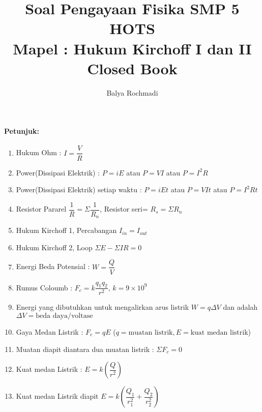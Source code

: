\documentclass[12pt,a4paper,draft,final,oneside,twoside,openright,openany]{article}
\author{Balya Rochmadi}
\title{Soal Pengayaan Fisika SMP 5 HOTS\\Mapel : Hukum Kirchoff I dan II \\Closed Book}
\begin{document}
	\maketitle
	\Large
	\noindent\makebox[\linewidth]{\rule{\paperwidth}{0.4pt}}

	\paragraph{Petunjuk: }
				\begin{enumerate}
					\item Hukum Ohm : $I=\dfrac{V}{R}$
					\item Power(Dissipasi Elektrik) : $P=iE$ atau $P=VI$ atau $P=I^2R$
					\item Power(Dissipasi Elektrik) setiap waktu : $P=iEt$ atau $P=VIt$ atau $P=I^2Rt$
					\item Resistor Pararel $\dfrac{1}{R}=\Sigma \dfrac{1}{R_n}$, Resistor seri= $R_s=\Sigma R_n$
					\item Hukum Kirchoff 1, Percabangan $I_{in}=I_{out}$
					\item Hukum Kirchoff 2, Loop $\Sigma E -\Sigma IR= 0$
					\item Energi Beda Potensial : 	$W=\dfrac{Q}{V}$
						\item Rumus Coloumb	: $F_c=k\dfrac{q_1q_2}{r^2}$, $k=9\times 10^9$
						\item Energi yang dibutuhkan untuk mengalirkan arus listrik $W=q\Delta V$ dan  adalah $\Delta V=\text{beda daya/voltase}$
						\item Gaya Medan Listrik : $F_{e}=qE$ ($q=\text{muatan listrik}, E=\text{kuat medan listrik}$)
						\item Muatan diapit diantara dua muatan listrik : $\Sigma F_c=0$
						\item Kuat medan Listrik : $E=k(\dfrac{Q}{r^2})$
						\item Kuat medan Listrik diapit $E=k(\dfrac{Q_1}{r_1^2}+\dfrac{Q_2}{r_2^2})$
					
				\end{enumerate}
					\noindent\makebox[\linewidth]{\rule{\paperwidth}{0.4pt}}
\end{document}
